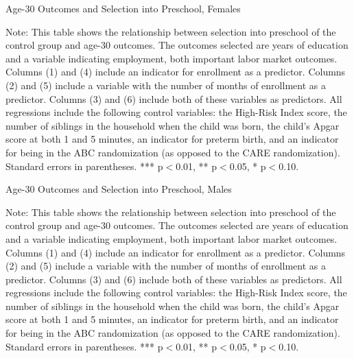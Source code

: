 \begin{table}[htbp]
\begin{center}
	\caption{Age-30 Outcomes and Selection into Preschool, Females} \label{tab:pq-female}
	\scalebox{1}{
		
	}
\end{center}
\raggedright \footnotesize
Note: This table shows the relationship between selection into preschool of the control group and age-30 outcomes. The outcomes selected are years of education and a variable indicating employment, both important labor market outcomes. Columns (1) and (4) include an indicator for enrollment as a predictor. Columns (2) and (5) include a variable with the number of months of enrollment as a predictor. Columns (3) and (6) include both of these variables as predictors. All regressions include the following control variables: the High-Risk Index score, the number of siblings in the household when the child was born, the child's Apgar score at both 1 and 5 minutes, an indicator for preterm birth, and an indicator for being in the ABC randomization (as opposed to the CARE randomization). Standard errors in parentheses. *** p$<$0.01, ** p$<$0.05, * p$<$0.10.
\end{table}

\begin{table}[htbp]
\begin{center}
	\caption{Age-30 Outcomes and Selection into Preschool, Males} \label{tab:pq-male}
	\scalebox{1}{
		
	}
\end{center}
\raggedright \footnotesize
Note: This table shows the relationship between selection into preschool of the control group and age-30 outcomes. The outcomes selected are years of education and a variable indicating employment, both important labor market outcomes. Columns (1) and (4) include an indicator for enrollment as a predictor. Columns (2) and (5) include a variable with the number of months of enrollment as a predictor. Columns (3) and (6) include both of these variables as predictors. All regressions include the following control variables: the High-Risk Index score, the number of siblings in the household when the child was born, the child's Apgar score at both 1 and 5 minutes, an indicator for preterm birth, and an indicator for being in the ABC randomization (as opposed to the CARE randomization). Standard errors in parentheses. *** p$<$0.01, ** p$<$0.05, * p$<$0.10.
\end{table}




